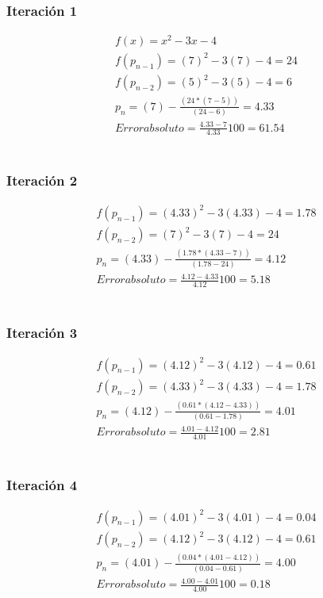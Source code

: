 \documentclass[10pt,technote]{IEEEtran}
\begin{document}
\subsubsection{Iteración 1}
\begin{gather*}
    f(x) =x^{2}-3x-4 \\
    f(p_{n-1}) =(7)^{2}-3(7)-4 = 24 \\
    f(p_{n-2}) =(5)^{2}-3(5)-4 = 6 \\
    p_n = (7)- \frac{(24*(7-5))}{(24-6)} = 4.33 \\
    Error absoluto = \frac{4.33-7}{4.33}100 = 61.54 
\end{gather*} \\

\subsubsection{Iteración 2}
\begin{gather*}
    f(p_{n-1}) =(4.33)^{2}-3(4.33)-4 = 1.78 \\
    f(p_{n-2}) =(7)^{2}-3(7)-4 = 24 \\
    p_n = (4.33)- \frac{(1.78*(4.33-7))}{(1.78-24)} = 4.12 \\
    Error absoluto = \frac{4.12-4.33}{4.12}100 = 5.18
\end{gather*} \\

\subsubsection{Iteración 3}
\begin{gather*}
    f(p_{n-1}) =(4.12)^{2}-3(4.12)-4 = 0.61 \\
    f(p_{n-2}) =(4.33)^{2}-3(4.33)-4 = 1.78 \\
    p_n = (4.12)- \frac{(0.61*(4.12-4.33))}{(0.61-1.78)} = 4.01 \\
    Error absoluto = \frac{4.01-4.12}{4.01}100 = 2.81
\end{gather*} \\

\subsubsection{Iteración 4}
\begin{gather*}
    f(p_{n-1}) =(4.01)^{2}-3(4.01)-4 = 0.04 \\
    f(p_{n-2}) =(4.12)^{2}-3(4.12)-4 = 0.61 \\
    p_n = (4.01)- \frac{(0.04*(4.01-4.12))}{(0.04-0.61)} = 4.00 \\
    Error absoluto = \frac{4.00-4.01}{4.00}100 = 0.18
\end{gather*} \\
\end{document}
